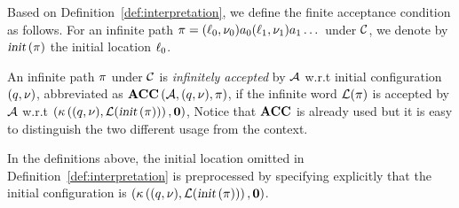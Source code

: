 Based on Definition~\ref{def:interpretation}, we define the finite acceptance condition as follows.
For an infinite path $\pi=(\ell_0,\nu_0)a_0(\ell_1,\nu_1)a_1\dots$ under $\mathcal{C}$, we denote by 
$\mbox{\sl init}\left(\pi\right)$ the initial location $\ell_0$.
\begin{definition}\label{def:fnacc}
An infinite path $\pi$ under $\mathcal{C}$ is \emph{infinitely accepted} by $\mathcal{A}$ w.r.t 
initial configuration $(q,\nu)$, abbreviated as $\mbox{\bf ACC} \left( {\mathcal{A}}, {(q,\nu)}, {\pi} \right)$, 
if the infinite word $\mathcal{L}(\pi)$ is accepted by $\mathcal{A}$ w.r.t 
$
\left(\kappa\left((q,\nu), \mathcal{L}(\mbox{\sl init}\left(\pi\right))\right),\mathbf{0}\right)
$,
Notice that $\mbox{\bf ACC}$ is already used but it is easy to distinguish the two different usage from the context. 
\end{definition}
In the definitions above, the initial location omitted in Definition~\ref{def:interpretation} is preprocessed by specifying explicitly that the initial configuration is $\left(\kappa\left((q,\nu), \mathcal{L}(\mbox{\sl init}\left(\pi\right))\right),\mathbf{0}\right)$.

